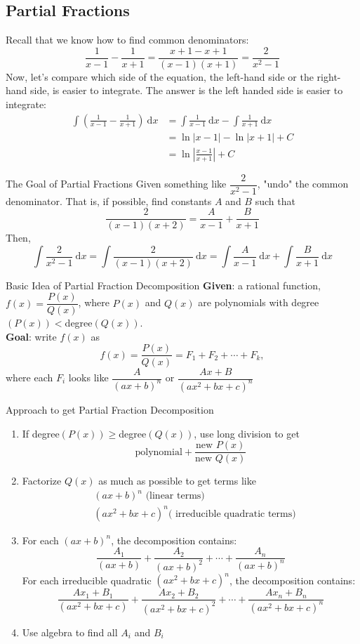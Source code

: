 \documentclass[12pt,a4paper]{article}
\def\d{{\mathrm{d}}}
\begin{document}
\subsection{Partial Fractions}
Recall that we know how to find common denominators: 
$$\frac{1}{x-1}-\frac{1}{x+1}=\frac{x+1-x+1}{(x-1)(x+1)}=\frac{2}{x^2-1}$$
Now, let's compare which side of the equation, the left-hand side or the right-hand side, is easier to integrate. The answer is the left handed side is easier to integrate: 
$$\begin{aligned}
	\int\left(\frac{1}{x-1}-\frac{1}{x+1}\right)\ \d x&=\int\frac{1}{x-1}\ \d x-\int\frac{1}{x+1}\ \d x\\
	&=\ln\left|x-1\right|-\ln\left|x+1\right|+C\\
	&=\ln\left|\frac{x-1}{x+1}\right|+C
\end{aligned}$$
\begin{eg}{The Goal of Partial Fractions}
	Given something like $\dfrac{2}{x^2-1}$, "undo" the common denominator. That is, if possible, find constants $A$ and $B$ such that
	$$\frac{2}{(x-1)(x+2)}=\frac{A}{x-1}+\frac{B}{x+1}$$
	Then, 
	$$\int\frac{2}{x^2-1}\ \d x = \int\frac{2}{(x-1)(x+2)}\ \d x = \int\frac{A}{x-1}\ \d x+\int\frac{B}{x+1}\ \d x$$
\end{eg}
\begin{thm}{Basic Idea of Partial Fraction Decomposition}
	\textbf{Given}: a rational function, $f(x)=\dfrac{P(x)}{Q(x)}$, where $P(x)$ and $Q(x)$ are polynomials with degree$(P(x))<$degree$(Q(x))$.\\
	\textbf{Goal}: write $f(x)$ as $$f(x)=\frac{P(x)}{Q(x)}=F_1+F_2+\cdots+F_k,$$where each $F_i$ looks like $\dfrac{A}{(ax+b)^n}$ or $\dfrac{Ax+B}{(ax^2+bx+c)^n}$
\end{thm}
\begin{thm}{Approach to get Partial Fraction Decomposition}
	\begin{enumerate}
		\item If degree$(P(x))\geq$degree$(Q(x))$, use long division to get $$\text{polynomial}+\frac{\text{new }P(x)}{\text{new }Q(x)}$$
		\item Factorize $Q(x)$ as much as possible to get terms like \\ $$\begin{aligned}&(ax+b)^n\text{ (linear terms)}\\&(ax^2+bx+c)^n\text{( irreducible quadratic terms)}\end{aligned}$$
		\item For each $(ax+b)^n$, the decomposition contains: $$\frac{A_1}{(ax+b)}+\frac{A_2}{(ax+b)^2}+\cdots+\frac{A_n}{(ax+b)^n}$$For each irreducible quadratic $(ax^2+b x+c)^n$, the decomposition contains: $$\frac{Ax_1+B_1}{(ax^2+bx+c)}+\frac{Ax_2+B_2}{(ax^2+bx+c)^2}+\cdots+\frac{Ax_n+B_n}{(ax^2+bx+c)^n}$$
		\item Use algebra to find all $A_i$ and $B_i$
	\end{enumerate}
\end{thm}
\end{document}
